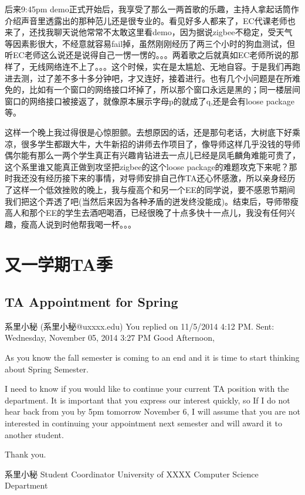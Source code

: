 \documentclass[12pt]{book}
\begin{document}
后来9:45pm demo正式开始后，我享受了那么一两首歌的乐趣，主持人拿起话筒作介绍声音里透露出的那种范儿还是很专业的。看见好多人都来了，EC代课老师也来了，还找我聊天说他常常不太敢这里看demo，因为据说zigbee不稳定，受天气等因素影很大，不经意就容易fail掉，虽然刚刚经历了两三个小时的狗血测试，但听EC老师这么说还是说得自己一愣一愣的。。。两着歌之后就真如EC老师所说的那样了，无线网络连不上了。。。这个时候，实在是太尴尬、无地自容。于是我们再跑进去测，过了差不多十多分钟吧，才又连好，接着进行。也有几个小问题是在所难免的，比如有一个窗口的网络接口坏掉了，所以那个窗口永远是黑的；同一楼层间窗口的网络接口被接返了，就像原本展示字母p的就成了q,还是会有loose package等。

这样一个晚上我过得很是心惊胆颤。去想原因的话，还是那句老话，大树底下好乘凉，很多学生都跟大牛，大牛新招的讲师去作项目了，像导师这样几乎没钱的导师偶尔能有那么一两个学生真正有兴趣肯钻进去一点儿已经是凤毛麟角难能可贵了，这个系里谁又能真正做到攻坚把zigbee的这个loose package的难题攻克下来呢？那时我还没有经历接下来的事情，对导师安排自己作TA还心怀感激，所以亲身经历了这样一个低效挫败的晚上，我与瘦高个和另一个EE的同学说，要不感恩节期间我们把这个弄透了吧(当然后来因为各种矛盾的迸发终没能成)。结束后，导师带瘦高人和那个EE的学生去酒吧喝酒，已经很晚了十点多快十一点儿，我没有任何兴趣，瘦高人说到时他帮我喝一杯。。。

\chapter{又一学期TA季}
\label{sec-17}
\section{TA Appointment for Spring}
\label{sec-17-1}
系里小秘 (系里小秘@uxxxx.edu)
You replied on 11/5/2014 4:12 PM.
Sent:        Wednesday, November 05, 2014 3:27 PM
Good Afternoon,

As you know the fall semester is coming to an end and it is time to start thinking about Spring Semester.

I need to know if you would like to continue your current TA position with the department. It is important that you express our interest quickly, so If I do not hear back from you by 5pm tomorrow November 6, I will assume that you are not interested in continuing your appointment next semester and will award it to another student.

Thank you.

系里小秘
Student Coordinator
University of XXXX
Computer Science Department
\end{document}
